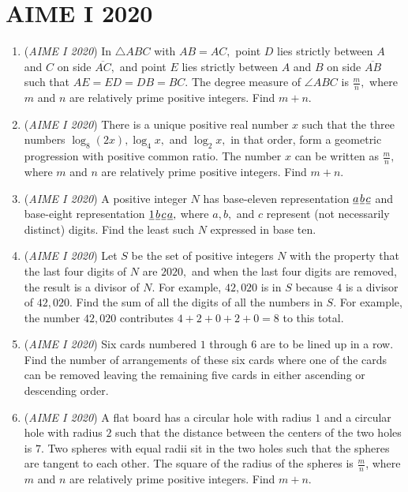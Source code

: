 \section{AIME I 2020}
        \begin{enumerate}
        	\item (\textit{AIME I 2020}) In $\triangle ABC$ with $AB=AC,$ point $D$ lies strictly between $A$ and $C$ on side $\overline{AC},$ and point $E$ lies strictly between $A$ and $B$ on side $\overline{AB}$ such that $AE=ED=DB=BC.$ The degree measure of $\angle ABC$ is $\frac{m}{n},$ where $m$ and $n$ are relatively prime positive integers. Find $m+n.$


	\item (\textit{AIME I 2020}) There is a unique positive real number $x$ such that the three numbers $\log_8(2x),\log_4x,$ and $\log_2x,$ in that order, form a geometric progression with positive common ratio. The number $x$ can be written as $\frac{m}{n},$ where $m$ and $n$ are relatively prime positive integers. Find $m+n.$


	\item (\textit{AIME I 2020}) A positive integer $N$ has base-eleven representation $\underline{a}\kern 0.1em\underline{b}\kern 0.1em\underline{c}$ and base-eight representation $\underline1\kern 0.1em\underline{b}\kern 0.1em\underline{c}\kern 0.1em\underline{a},$ where $a,b,$ and $c$ represent (not necessarily distinct) digits. Find the least such $N$ expressed in base ten.


 

	\item (\textit{AIME I 2020}) Let $S$ be the set of positive integers $N$ with the property that the last four digits of $N$ are $2020,$ and when the last four digits are removed, the result is a divisor of $N.$ For example, $42{,}020$ is in $S$ because $4$ is a divisor of $42{,}020.$ Find the sum of all the digits of all the numbers in $S.$ For example, the number $42{,}020$ contributes $4+2+0+2+0=8$ to this total.


 

	\item (\textit{AIME I 2020}) Six cards numbered $1$ through $6$ are to be lined up in a row. Find the number of arrangements of these six cards where one of the cards can be removed leaving the remaining five cards in either ascending or descending order.


 

	\item (\textit{AIME I 2020}) A flat board has a circular hole with radius $1$ and a circular hole with radius $2$ such that the distance between the centers of the two holes is $7$. Two spheres with equal radii sit in the two holes such that the spheres are tangent to each other. The square of the radius of the spheres is $\frac{m}{n}$, where $m$ and $n$ are relatively prime positive integers. Find $m+n$.



\end{enumerate}
